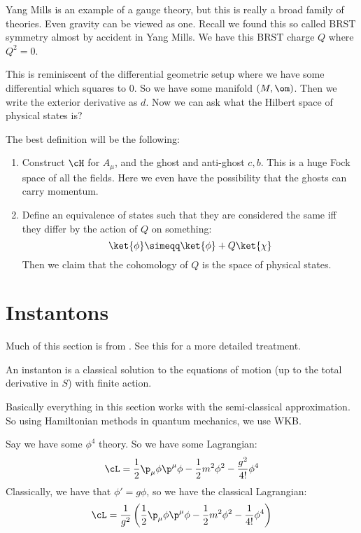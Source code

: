 \documentclass{booc}
\begin{document}
Yang Mills is an example of a gauge theory, 
but this is really a broad family of theories.
Even gravity can be viewed as one. 
Recall we found this so called BRST symmetry almost by accident in Yang Mills.
We have this BRST charge $Q$ where $Q^2 = 0$. 

This is reminiscent of the differential geometric setup
where we have some differential which squares to $0$. 
So we have some manifold $\left( M , \om \right)$. 
Then we write the exterior derivative as $d$.
Now we can ask what the Hilbert space of physical states is?

The best definition will be the following:
\begin{enumerate}
\item Construct $\cH$ for $A_\mu$, and the ghost and anti-ghost $c , b$.
This is a huge Fock space of all the fields.
Here we even have the possibility that the ghosts can carry momentum.

\item Define an equivalence of states such that they are considered the same iff
they differ by the action of $Q$ on something:
\begin{equation}
\ket{\phi} \simeqq \ket{\phi} + Q \ket{\chi}
\end{equation}
Then we claim  that the cohomology of $Q$ is the space of physical states.
\end{enumerate}

\section{Instantons}

Much of this section is from \cite{coleman_symmetry}.
See this for a more detailed treatment. 

\begin{defn}
An instanton is a classical solution to the equations of motion (up to the total derivative
in $S$) with finite action.
\end{defn}

Basically everything in this section works with the semi-classical approximation. 
So using Hamiltonian methods in quantum mechanics, we use WKB.

Say we have some $\phi^4$ theory. 
So we have some Lagrangian:
\begin{equation}
\cL = \frac{1}{2} \p_\mu \phi \p^\mu \phi - \frac{1}{2} m^2 \phi^2 - 
\frac{g^2}{4!} \phi^4
\end{equation}
Classically, we have that $\phi' = g\phi$, 
so we have the classical Lagrangian:
\begin{equation}
\cL = \frac{1}{g^2}\left( 
\frac{1}{2} \p_\mu \phi \p^\mu \phi - \frac{1}{2} m^2 \phi^2- \frac{1}{4!} \phi^4\right)
\end{equation}
\end{document}

